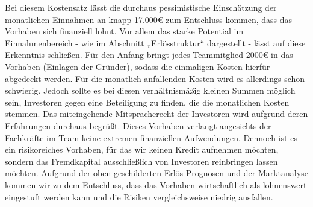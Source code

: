 Bei diesem Kostensatz lässt die durchaus pessimistische Einschätzung der monatlichen Einnahmen an knapp 17.000{\euro} zum Entschluss kommen, dass das Vorhaben sich finanziell lohnt. Vor allem das starke Potential im Einnahmenbereich - wie im Abschnitt „Erlösstruktur“ dargestellt - lässt auf diese Erkenntnis schließen.
Für den Anfang bringt jedes Teammitglied 2000{\euro} in das Vorhaben (Einlagen der Gründer), sodass die einmaligen Kosten hierfür abgedeckt werden. Für die monatlich anfallenden Kosten wird es allerdings schon schwierig. Jedoch sollte es bei diesen verhältnismäßig kleinen Summen möglich sein, Investoren gegen eine Beteiligung zu finden, die die monatlichen Kosten stemmen. Das miteingehende Mitspracherecht der Investoren wird aufgrund deren Erfahrungen durchaus begrüßt. Dieses Vorhaben verlangt angesichts der Fachkräfte im Team keine extremen finanziellen Aufwendungen. Dennoch ist es ein risikoreiches Vorhaben, für das wir keinen Kredit aufnehmen möchten, sondern das Fremdkapital ausschließlich von Investoren reinbringen lassen möchten. Aufgrund der oben geschilderten Erlös-Prognosen und der Marktanalyse kommen wir zu dem Entschluss, dass das Vorhaben wirtschaftlich als lohnenswert eingestuft werden kann und die Risiken vergleichsweise niedrig ausfallen.


